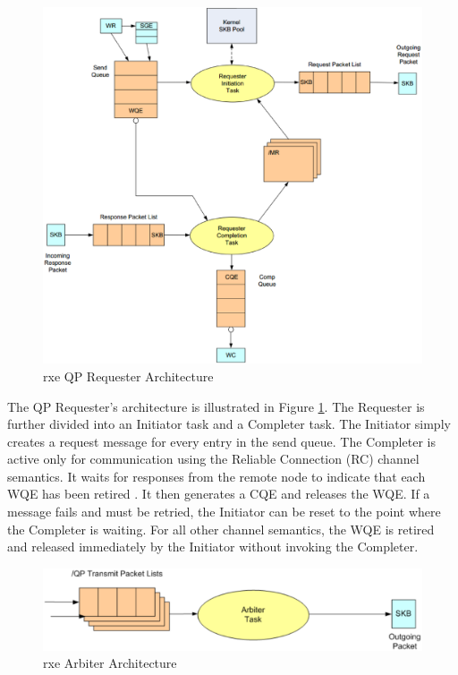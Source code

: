 \documentclass[11pt]{book}
\begin{document}
\begin{figure}
\includegraphics[width=\textwidth]{rxe_req}
\caption{rxe QP Requester Architecture \protect\cite{pearson-10}}\label{rxe-req} 
\end{figure}

The QP Requester's architecture is illustrated in Figure \ref{rxe-req}.  The Requester is
further divided into an Initiator task and a Completer task.  The Initiator simply creates
a request message for every entry in the send queue.  The Completer is active only for
communication using the Reliable Connection (RC) channel semantics.  It waits for
responses from the remote node to indicate that each WQE has been retired \cite
{pearson-10}. It then generates a CQE and releases the WQE. If a message fails and must be
retried, the Initiator can be reset to the point where the Completer is waiting.  For all
other channel semantics, the WQE is retired and released immediately by the Initiator
without invoking the Completer.

\begin{figure}
\includegraphics[width=\textwidth]{rxe_arbiter}
\caption{rxe Arbiter Architecture \protect\cite{pearson-10}}\label{rxe-arbiter}
\end{figure}
\end{document}
